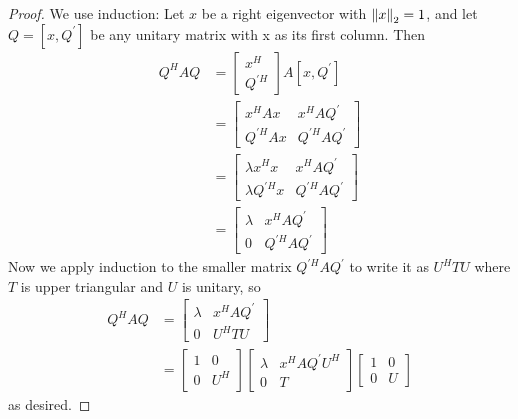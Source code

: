 \documentclass[11pt]{article}
\numberwithin{equation}{section}
\begin{document}
\begin{proof}
    We use induction: Let $x$ be a right eigenvector with $\left\| x \right\|_2 = 1$, and let $Q = [x,Q^\prime]$ be any unitary matrix with x as its first column. Then \begin{align*}
        Q^{H} A Q &= \left[\begin{array}{l}
            x^{H} \\
            Q^{\prime H}
            \end{array}\right] A\left[x, Q^{\prime}\right] \\
        &= \left[\begin{array}{ll}
            x^{H} A x & x^{H} A Q^\prime \\
            Q^{\prime H} A x & Q^{\prime H} A Q^\prime
            \end{array}\right] \\
        &= \left[\begin{array}{ll}
            \lambda x^{H} x & x^{H} A Q^{\prime} \\
            \lambda Q^{\prime H} x & Q^{\prime H} A Q^\prime
            \end{array}\right] \\
        &= \left[\begin{array}{ll}
            \lambda & x^{H} A Q^{\prime} \\
            0 & Q^{\prime H} A Q^\prime
            \end{array}\right]
    \end{align*}
    Now we apply induction to the smaller matrix $Q^{\prime H} A Q^\prime$ to write it as $U^H TU$ where $T$ is upper triangular and $U$ is unitary, so \begin{align*}
        Q^{H} A Q &= \left[\begin{array}{ll}
            \lambda & x^{H} A Q^{\prime} \\
            0 & U^H TU
            \end{array}\right] \\
        &= \left[\begin{array}{ll}
            1 & 0 \\
            0 & U^H
            \end{array}\right] \left[\begin{array}{ll}
                \lambda & x^{H} A Q^{\prime} U^H \\
                0 & T
                \end{array}\right]\left[\begin{array}{ll}
                    1 & 0 \\
                    0 & U
                    \end{array}\right]
    \end{align*}
    as desired.
\end{proof}
\end{document}
